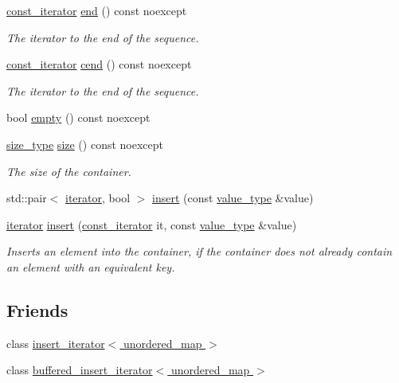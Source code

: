 \begin{DoxyCompactItemize}
\hyperlink{group__Types_ga102c3cd521767bf4b22f3788ccc054e8}{const\-\_\-iterator} \hyperlink{group__Iterators_gadc7ab9a75de9a65c0b74fe21f5ec5704}{end} () const noexcept
\begin{DoxyCompactList}\small\item\em The iterator to the end of the sequence. \end{DoxyCompactList}\item 
\hyperlink{group__Types_ga102c3cd521767bf4b22f3788ccc054e8}{const\-\_\-iterator} \hyperlink{group__Iterators_ga2d943633cd73b5040014600a9cfe7084}{cend} () const noexcept
\begin{DoxyCompactList}\small\item\em The iterator to the end of the sequence. \end{DoxyCompactList}\item 
bool \hyperlink{group__Capacity_gade6abbe1bedf25b8c2fb53eab2420e71}{empty} () const noexcept
\item 
\hyperlink{group__Types_ga2a84980e6d435a8a7b1a99f78b828a65}{size\-\_\-type} \hyperlink{group__Capacity_ga0d8b21fa4842806604fa7a5f82d6f637}{size} () const noexcept
\begin{DoxyCompactList}\small\item\em The size of the container. \end{DoxyCompactList}\item 
std\-::pair$<$ \hyperlink{group__Types_gab52d604c26835c20a0363f9affa7ff57}{iterator}, bool $>$ \hyperlink{group__Modifiers_gaca23a3638ad26f39038d7535b70b337d}{insert} (const \hyperlink{group__Types_ga930e4848d41a2efe4d2e47f52650a76c}{value\-\_\-type} \&value)
\item 
\hyperlink{group__Types_gab52d604c26835c20a0363f9affa7ff57}{iterator} \hyperlink{group__Modifiers_ga93d0a1781c0b474b44ec1fccc691a6f2}{insert} (\hyperlink{group__Types_ga102c3cd521767bf4b22f3788ccc054e8}{const\-\_\-iterator} it, const \hyperlink{group__Types_ga930e4848d41a2efe4d2e47f52650a76c}{value\-\_\-type} \&value)
\begin{DoxyCompactList}\small\item\em Inserts an element into the container, if the container does not already contain an element with an equivalent key. \end{DoxyCompactList}\end{DoxyCompactItemize}
\subsection*{Friends}
\begin{DoxyCompactItemize}
\item 
class \hyperlink{classshad_1_1unordered__map_a585b0ce25cd77eb35696929ffdc9fffe}{insert\-\_\-iterator$<$ unordered\-\_\-map $>$}
\item 
class \hyperlink{classshad_1_1unordered__map_a178983bb5902294d2c70ed8b802b4a03}{buffered\-\_\-insert\-\_\-iterator$<$ unordered\-\_\-map $>$}
\end{DoxyCompactItemize}


